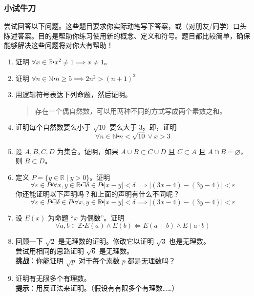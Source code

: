 \subsubsection*{小试牛刀}

尝试回答以下问题。这些题目要求你实际动笔写下答案，或（对朋友/同学）口头陈述答案。目的是帮助你练习使用新的概念、定义和符号。题目都比较简单，确保能够解决这些问题将对你大有帮助！

\begin{enumerate}[label=(\arabic*)]
    \item 证明 $\forall x \in \mathbb{R} \centerdot x^2 \ne 1 \implies x \ne 1$。
    \item 证明 $\forall n \in \mathbb{N} \centerdot n \ge 5 \implies 2n^2 > (n+1)^2$ \label{exc:exercises4.9.2}
    \item 用逻辑符号表达下列命题，然后证明。
        \begin{quote}
            存在一个偶自然数，可以用两种不同的方式写成两个素数之和。
        \end{quote}
    \item 证明每个自然数要么小于 $\sqrt{10}$ 要么大于 $3$。即，证明
        \[\forall n \in \mathbb{N} \centerdot n<\sqrt{10} \lor x>3\]
    \item 设 $A,B,C,D$ 为集合。证明，如果 $A \cup B \subset C \cup D$ 且 $C \subset A$ 且 $A \cap B = \varnothing$，则 $B \subset D$。
    \item 定义 $P = \{y \in \mathbb{R} \mid y > 0\}$。证明
        \[\forall \varepsilon \in P \centerdot \forall x, y \in \mathbb{R} \centerdot \exists \delta \in P \centerdot |x - y| < \delta \implies |(3x - 4) - (3y - 4)| < \varepsilon\]
        你还能证明以下声明吗？和上面的声明有什么不同呢？
        \[\forall \varepsilon \in P \centerdot \exists \delta \in P \centerdot \forall x, y \in \mathbb{R} \centerdot  |x - y| < \delta \implies |(3x - 4) - (3y - 4)| < \varepsilon\]
    \item 设 $E(x)$ 为命题 ``$x$ 为偶数''。证明
        \[\forall a, b \in \mathbb{Z} \centerdot E(a) \land E(b) \iff E(a + b) \land E(a \cdot b)\]
    \item 回顾一下 $\sqrt{2}$ 是无理数的证明。修改它以证明 $\sqrt{3}$ 也是无理数。\\
        尝试用相同的思路证明 $\sqrt{6}$ 是无理数。\\
        \textbf{挑战}：你能证明 $\sqrt{p}$ 对于每个素数 $p$ 都是无理数吗？
    \item 证明有无限多个有理数。\\
        \textbf{提示}：用反证法来证明。（假设有有限多个有理数……）
\end{enumerate}